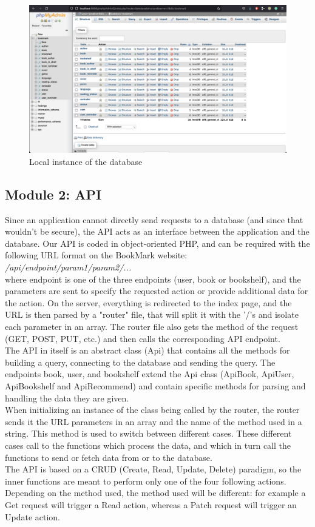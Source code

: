 \documentclass[conference]{IEEEtran}
\begin{document}
\begin{figure}[h]
    \includegraphics[width=\columnwidth]{Resources/Architecture/Database.png} 
    \caption{Local instance of the database}
    \label{fig:dblocal}
\end{figure}

\subsection{Module 2: API}

Since an application cannot directly send requests to a database (and since that wouldn't be secure), the API acts as an interface between the application and the database.
Our API is coded in object-oriented PHP, and can be required with the following URL format on the BookMark website:\\ \textit{/api/endpoint/param1/param2/...}\\
where endpoint is one of the three endpoints (user, book or bookshelf), and the parameters are sent to specify the requested action or provide additional data for the action. On the server, everything is redirected to the index page, and the URL is then parsed by a "router" file, that will split it with the '/'s and isolate each parameter in an array. The router file also gets the method of the request (GET, POST, PUT, etc.) and then calls the corresponding API endpoint.\\

The API in itself is an abstract class (Api) that contains all the methods for building a query, connecting to the database and sending the query. The endpoints book, user, and bookshelf extend the Api class (ApiBook, ApiUser, ApiBookshelf and ApiRecommend) and contain specific methods for parsing and handling the data they are given.\\
When initializing an instance of the class being called by the router, the router sends it the URL parameters in an array and the name of the method used in a string. This method is used to switch between different cases. These different cases call to the functions which process the data, and which in turn call the functions to send or fetch data from or to the database.\\
The API is based on a CRUD (Create, Read, Update, Delete) paradigm, so the inner functions are meant to perform only one of the four following actions. Depending on the method used, the method used will be different: for example a Get request will trigger a Read action, whereas a Patch request will trigger an Update action.
\end{document}

